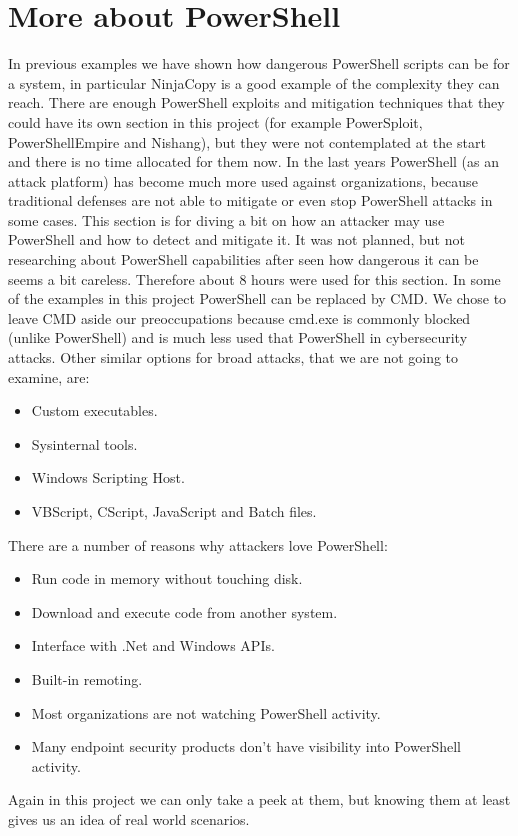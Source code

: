 \section{More about PowerShell}
In previous examples we have shown how dangerous PowerShell scripts can be for a system, in particular NinjaCopy is a good example of the complexity they can reach.
\linej
There are enough PowerShell exploits and mitigation techniques that they could have its own section in this project (for example PowerSploit, PowerShellEmpire and Nishang), but they were not contemplated at the start and there is no time allocated for them now.
In the last years PowerShell (as an attack platform) has become much more used against organizations, because traditional defenses are not able to mitigate or even stop PowerShell attacks in some cases.
\linej
This section is for diving a bit on how an attacker may use PowerShell and how to detect and mitigate it. It was not planned, but not researching about PowerShell capabilities after seen how dangerous it can be seems a bit careless. Therefore about 8 hours were used for this section.
\linej
\linej
In some of the examples in this project PowerShell can be replaced by CMD.
We chose to leave CMD aside our preoccupations because cmd.exe is commonly blocked (unlike PowerShell) and is much less used that PowerShell in cybersecurity attacks.
\linej
\linej
Other similar options for broad attacks, that we are not going to examine, are\cite{powershell_adsecurity}:
\begin{itemize}
\item Custom executables.
\item Sysinternal tools.
\item Windows Scripting Host.
\item VBScript, CScript, JavaScript and Batch files.
\end{itemize}
\linej
There are a number of reasons why attackers love PowerShell\cite{powershell_adsecurity}:
\begin{itemize}
\item Run code in memory without touching disk.
\item Download and execute code from another system.
\item Interface with .Net and Windows APIs.
\item Built-in remoting.
\item Most organizations are not watching PowerShell activity.
\item Many endpoint security products don’t have visibility into PowerShell activity.
\end{itemize}
\linej
Again in this project we can only take a peek at them, but knowing them at least gives us an idea of real world scenarios.

